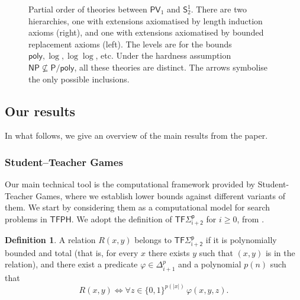 \documentclass[11pt]{article}
\newcommand{\poly}{\mathsf{poly}}
\renewcommand{\P}{\mathsf{P}}
\newcommand{\NP}{\mathsf{NP}}
\newcommand{\PV}{\mathsf{PV}}
\theoremstyle{definition}
\theoremstyle{definition}
\newtheorem{definition}[theorem]{Definition}
\theoremstyle{remark}
\begin{document}
\begin{figure}[ht]
\caption{Partial order of theories between $\PV_1$ and $\mathsf{S}^{1}_2$. There are two hierarchies, one with extensions axiomatised by length induction axioms (right), and one with extensions axiomatised by bounded replacement axioms (left). The levels are for the bounds $\poly,\log,\log\log$, etc.
Under the hardness assumption $\NP\not\subseteq \P/\poly$, all these theories are distinct. The arrows symbolise the only possible inclusions. }
\label{fig:theory-poset}
\end{figure}


\subsection{Our results}

In what follows, we give an overview of the main results from the paper.

\subsubsection{Student--Teacher Games} 
Our main technical tool is the computational framework provided by Student-Teacher Games, where we establish lower bounds against different variants of them. We start by considering them as a computational model for search problems in $\mathsf{TFPH}$. We adopt the definition of $\mathsf{TF\Sigma^p_{i+2}}$ for $i\geq 0$, from \cite{KleinbergKMP21}.

\begin{definition}
A relation $R(x, y)$ belongs to $\mathsf{TF\Sigma^p_{i+2}}$ if it is polynomially bounded and total (that is, for every $x$ there exists $y$ such that $(x, y)$ is in the relation), and there exist a predicate $\varphi\in \Delta^p_{i+1}$ and a polynomial $p(n)$ such that
\[
R(x, y) \iff \forall z \in \{0,1\}^{p(|x|)}\, \varphi(x, y, z).
\]
\end{definition}
\end{document}
